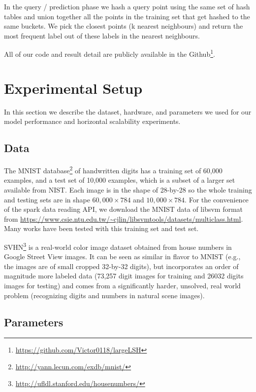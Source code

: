 \documentclass[letterpaper,twocolumn,10pt]{article}
\theoremstyle{definition}
\begin{document}
In the query / prediction phase we hash a query point using the same set of hash tables and union 
together all the points in the training set that get hashed to the same buckets. We pick the closest 
points (k nearest neighbours) and return the most frequent label out of these labels in the nearest 
neighbours.

All of our code and result detail are publicly available in the Github\footnote{\url{https://github.com/Victor0118/largeLSH}}.  

\section{Experimental Setup}

In this section we describe the dataset, hardware, and parameters we used for our model performance 
and horizontal scalability experiments.

\subsection{Data}
The MNIST database\footnote{\url{http://yann.lecun.com/exdb/mnist/}}\cite{lecun1998gradient} of handwritten digits has a training set of 60,000 examples, and a test set of 10,000 examples, which is a subset of a larger set available from NIST. Each image is in the shape of 28-by-28 so the whole training and testing sets are in shape $60,000 \times 784$ and $10,000 \times 784$. For the convenience of the spark data reading API, we download the MNIST data of libsvm format from \url{https://www.csie.ntu.edu.tw/~cjlin/libsvmtools/datasets/multiclass.html}.
Many works have been tested with this training set and test 
set\cite{lecun1998gradient,ciresan2011flexible,jarrett2009best}.

SVHN\footnote{\url{http://ufldl.stanford.edu/housenumbers/}}\cite{netzer2011reading} is a real-world color image dataset obtained from house numbers in Google
Street View images. It can be seen as similar in flavor to MNIST (e.g., the images are of small cropped 32-by-32 digits), but incorporates an order of magnitude more labeled data (73,257 digit images for training and 26032 digits images for testing) and comes from a significantly harder, unsolved, real world problem (recognizing digits and numbers in natural scene images). 

\subsection{Parameters}
\end{document}
